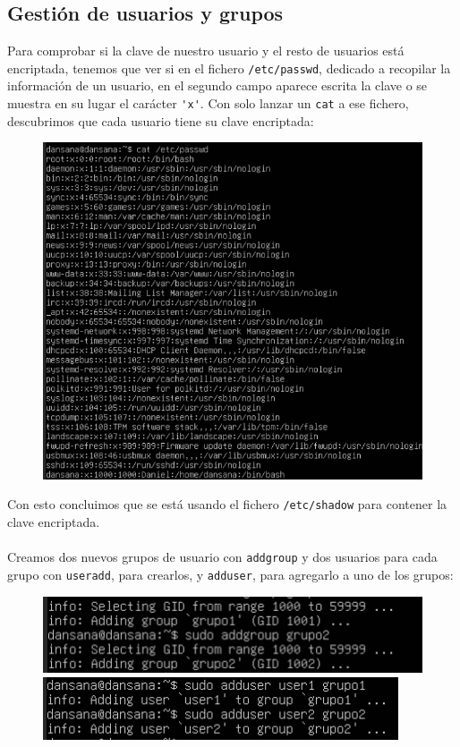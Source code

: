 \documentclass[10pt]{article}
\begin{document}
	\subsection{Gestión de usuarios y grupos}
	Para comprobar si la clave de nuestro usuario y el resto de usuarios está encriptada, tenemos que ver si en el fichero \verb|/etc/passwd|, dedicado a recopilar la información de un usuario, en el segundo campo aparece escrita la clave o se muestra en su lugar el carácter \verb|'x'|. Con solo lanzar un \verb|cat| a ese fichero, descubrimos que cada usuario tiene su clave encriptada:
	\begin{figure}[H]
		\setlength{\abovecaptionskip}{0cm}
		\setlength{\belowcaptionskip}{0cm}
		\centering
		\includegraphics[width=0.6\linewidth]{Recursos/passwd.png}
	\end{figure}
	Con esto concluimos que se está usando el fichero \verb|/etc/shadow| para contener la clave encriptada.\\\\
	Creamos dos nuevos grupos de usuario con \verb|addgroup| y dos usuarios para cada grupo con \verb|useradd|, para crearlos, y \verb|adduser|, para agregarlo a uno de los grupos:
	\begin{figure}[H]
		\centering
		\begin{minipage}{0.48\textwidth}
			\centering
			\includegraphics[width=\linewidth]{Recursos/userNuevos.png}
		\end{minipage}\hfill
		\begin{minipage}{0.48\textwidth}
			\centering
			\includegraphics[width=\linewidth]{Recursos/groupNuevos.png}
		\end{minipage}
	\end{figure}
\end{document}

